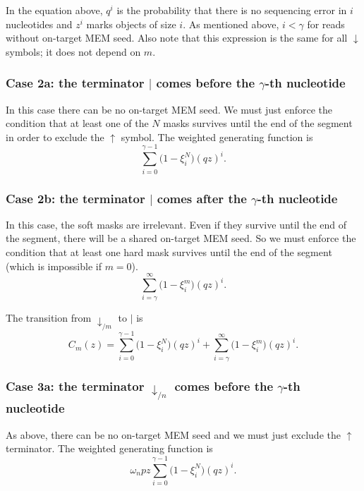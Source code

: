 \documentclass{article}
\begin{document}
In the equation above, $q^i$ is the probability that there is no
sequencing error in $i$ nucleotides and $z^i$ marks objects of size $i$.
As mentioned above, $i < \gamma$ for reads without on-target MEM seed.
Also note that this expression is the same for all $\downarrow$ symbols;
it does not depend on $m$.

\subsubsection*{Case 2a: the terminator $|$ comes before the $\gamma$-th
nucleotide}

In this case there can be no on-target MEM seed. We must just enforce the
condition that at least one of the $N$ masks survives until the end of the
segment in order to exclude the $\uparrow$ symbol. The weighted generating
function is
\begin{equation*}
\sum_{i=0}^{\gamma-1} \Big(1 - \xi_i^N \Big) (qz)^i.
\end{equation*}

\subsubsection*{Case 2b: the terminator $|$ comes after the $\gamma$-th
nucleotide}

In this case, the soft masks are irrelevant. Even if they survive until
the end of the segment, there will be a shared on-target MEM seed. So we
must enforce the condition that at least one hard mask survives until the
end of the segment (which is impossible if $m = 0$).
\begin{equation*}
\sum_{i=\gamma}^\infty \Big(1 - \xi_i^m \Big) (qz)^i.
\end{equation*}

The transition from $\downarrow_{/m}$ to $|$ is
\begin{equation}
\label{eq:C}
C_m(z) =
\sum_{i=0}^{\gamma-1} \Big(1 - \xi_i^N \Big) (qz)^i +
  \sum_{i=\gamma}^\infty \Big(1 - \xi_i^m \Big) (qz)^i.
\end{equation}

\subsubsection*{Case 3a: the terminator $\downarrow_{/n}$ comes before the
$\gamma$-th nucleotide}

As above, there can be no on-target MEM seed and we must just exclude the
$\uparrow$ terminator. The weighted generating function is
\begin{equation}
\omega_n pz \sum_{i=0}^{\gamma-1} \Big(1 - \xi_i^N \Big) (qz)^i.
\end{equation}
\end{document}

